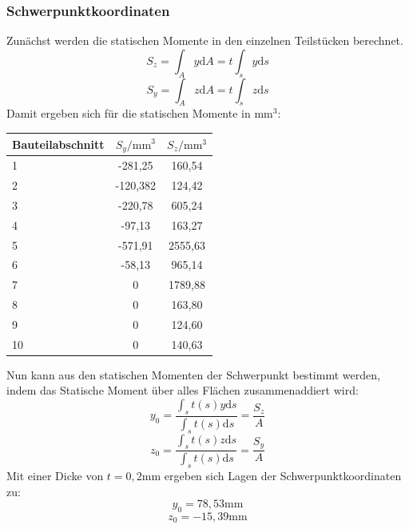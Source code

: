 \subsubsection{Schwerpunktkoordinaten}\label{SP-Koord}
Zunächst werden die statischen Momente in den einzelnen Teilstücken berechnet.
\begin{equation}\label{SM1}
	S_{z}=\int_{A}^{}y \mathrm{d}A =t\int_{s}^{}y \mathrm{d}s
\end{equation}
\begin{equation}\label{SM2}
	S_{y}=\int_{A}^{}z \mathrm{d}A =t\int_{s}^{}z \mathrm{d}s 
\end{equation}
Damit ergeben sich für die statischen Momente in $\mathrm{mm}^3$:

\begin{center}
\begin{tabular}[h]{l|c|c}
	
Bauteilabschnitt&$S_{y}/\mathrm{mm}^3$&$S_{z}/\mathrm{mm}^3$\\
\hline
1& -281,25&160,54\\
2&-120,382&124,42\\
3&-220,78&605,24\\
4&-97,13&163,27\\
5&-571,91&2555,63\\
6&-58,13&965,14\\
7&0&1789,88\\
8&0&163,80\\
9&0&124,60\\
10&0&140,63\\
\end{tabular}
\end{center}

\noindent Nun kann aus den statischen Momenten der Schwerpunkt bestimmt werden, indem das Statische Moment über alles Flächen zusammenaddiert wird:
\begin{equation}
	y_{0}=\frac{\int_{s}{}t(s)y\mathrm{d}s}{\int_{s}{}t(s)\mathrm{d}s}=\frac{S_{z}}{A}
\end{equation}
\begin{equation}
	z_{0}=\frac{\int_{s}{}t(s)z\mathrm{d}s}{\int_{s}{}t(s)\mathrm{d}s}=\frac{S_{y}}{A}
\end{equation}
Mit einer Dicke von $t=0,2\mathrm{mm}$ ergeben sich Lagen der Schwerpunktkoordinaten zu:
$$
	y_{0}=78,53\mathrm{mm}
$$
$$
	z_{0}=-15,39\mathrm{mm}
$$

